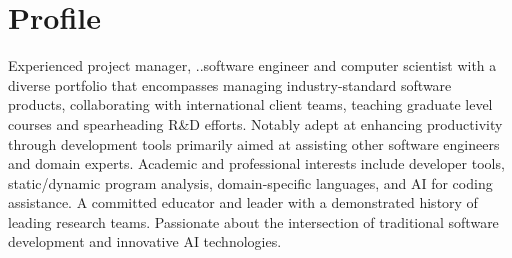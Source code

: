 \documentclass[12pt,a4paper,sans]{moderncv}
\begin{document}
\pagestyle{empty}
\makecvtitle

\section{Profile}
Experienced project manager, ..software engineer and computer scientist with a diverse portfolio that encompasses managing industry-standard software products, collaborating with international client teams, teaching graduate level courses and spearheading R\&D efforts. Notably adept at enhancing productivity through development tools primarily aimed at assisting other software engineers and domain experts. Academic and professional interests include developer tools, static/dynamic program analysis, domain-specific languages, and AI for coding assistance. A committed educator and leader with a demonstrated history of leading research teams. Passionate about the intersection of traditional software development and innovative AI technologies.
\end{document}

